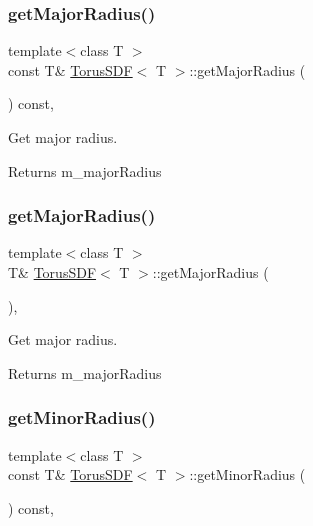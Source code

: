 \subsubsection{\texorpdfstring{get\+Major\+Radius()}{getMajorRadius()}\hspace{0.1cm}{\footnotesize\ttfamily [1/2]}}
{\footnotesize\ttfamily template$<$class T $>$ \\
const T\& \hyperlink{classTorusSDF}{Torus\+S\+DF}$<$ T $>$\+::get\+Major\+Radius (\begin{DoxyParamCaption}{ }\end{DoxyParamCaption}) const\hspace{0.3cm}{\ttfamily [inline]}, {\ttfamily [noexcept]}}



Get major radius. 

\begin{DoxyReturn}{Returns}
m\+\_\+major\+Radius 
\end{DoxyReturn}
\mbox{\label{classTorusSDF_a81910ce83df61223ab3484c7de0747c7}} 
\subsubsection{\texorpdfstring{get\+Major\+Radius()}{getMajorRadius()}\hspace{0.1cm}{\footnotesize\ttfamily [2/2]}}
{\footnotesize\ttfamily template$<$class T $>$ \\
T\& \hyperlink{classTorusSDF}{Torus\+S\+DF}$<$ T $>$\+::get\+Major\+Radius (\begin{DoxyParamCaption}{ }\end{DoxyParamCaption})\hspace{0.3cm}{\ttfamily [inline]}, {\ttfamily [noexcept]}}



Get major radius. 

\begin{DoxyReturn}{Returns}
m\+\_\+major\+Radius 
\end{DoxyReturn}
\mbox{\label{classTorusSDF_a3af383d80c8d11ab9d39fc872d661a42}} 
\subsubsection{\texorpdfstring{get\+Minor\+Radius()}{getMinorRadius()}\hspace{0.1cm}{\footnotesize\ttfamily [1/2]}}
{\footnotesize\ttfamily template$<$class T $>$ \\
const T\& \hyperlink{classTorusSDF}{Torus\+S\+DF}$<$ T $>$\+::get\+Minor\+Radius (\begin{DoxyParamCaption}{ }\end{DoxyParamCaption}) const\hspace{0.3cm}{\ttfamily [inline]}, {\ttfamily [noexcept]}}



